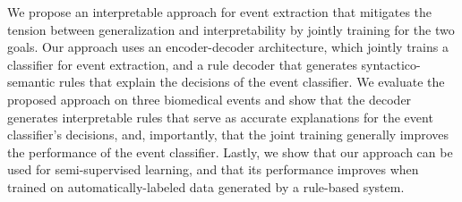 We propose an interpretable approach for event extraction that mitigates the tension between generalization and interpretability by jointly training for the two goals. Our approach uses an encoder-decoder architecture, which jointly trains a classifier for event extraction, and a rule decoder that generates syntactico-semantic rules that explain the decisions of the event classifier. We evaluate the proposed approach on three biomedical events and show that the decoder generates interpretable rules that serve as accurate explanations for the event classifier's decisions, and, importantly, that the joint training generally improves the performance of the event classifier. Lastly, we show that our approach can be used for semi-supervised learning, and that its performance improves when trained on automatically-labeled data generated by a rule-based system.
